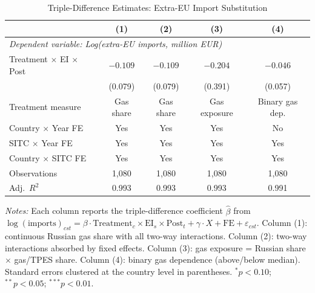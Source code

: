 \begin{table}[htbp]
\centering
\caption{Triple-Difference Estimates: Extra-EU Import Substitution}
\label{tab:triple_did}
\begin{tabular}{lcccc}
\toprule
 & (1) & (2) & (3) & (4) \\
\midrule
\multicolumn{5}{l}{\textit{Dependent variable: Log(extra-EU imports, million EUR)}} \\
\addlinespace
Treatment $\times$ EI $\times$ Post & $-0.109$ & $-0.109$ & $-0.204$ & $-0.046$ \\
 & (0.079) & (0.079) & (0.391) & (0.057) \\
\addlinespace
Treatment measure & Gas share & Gas share & Gas exposure & Binary gas dep. \\
\addlinespace
Country $\times$ Year FE & Yes & Yes & Yes & No \\
SITC $\times$ Year FE & Yes & Yes & Yes & Yes \\
Country $\times$ SITC FE & Yes & Yes & Yes & Yes \\
\addlinespace
Observations & 1,080 & 1,080 & 1,080 & 1,080 \\
Adj.\ $R^2$ & 0.993 & 0.993 & 0.993 & 0.991 \\
\bottomrule
\end{tabular}
\begin{tablenotes}[flushleft]
\small
\item \textit{Notes:} Each column reports the triple-difference coefficient $\hat{\beta}$ from $\log(\text{imports})_{cst} = \beta \cdot \text{Treatment}_c \times \text{EI}_s \times \text{Post}_t + \gamma \cdot X + \text{FE} + \varepsilon_{cst}$. Column (1): continuous Russian gas share with all two-way interactions. Column (2): two-way interactions absorbed by fixed effects. Column (3): gas exposure = Russian share $\times$ gas/TPES share. Column (4): binary gas dependence (above/below median). Standard errors clustered at the country level in parentheses. $^{*}p<0.10$; $^{**}p<0.05$; $^{***}p<0.01$.
\end{tablenotes}
\end{table}
